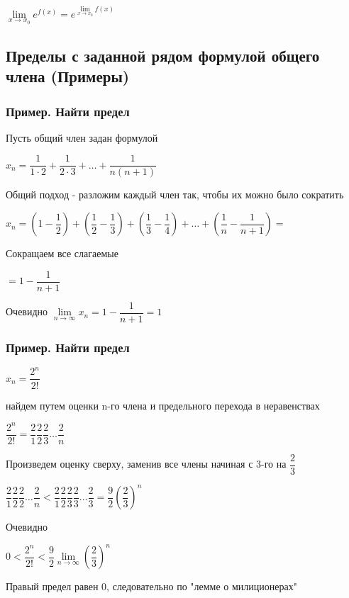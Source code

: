 $ \lim\limits_{x\to x_0} e^{f(x)} =  e^ {\lim\limits_{x\to x_0} {f(x)} }  $

\subsection{Пределы с заданной рядом формулой общего члена (Примеры)}

\subsubsection{Пример. Найти предел}

Пусть общий член задан формулой

$ x_{n} = \dfrac{1}{1 \cdot 2} + \dfrac{1}{2 \cdot 3} + \ldots + \dfrac{1}{n (n+1)}$

Общий подход - разложим каждый член так, чтобы их можно было сократить

$ x_{n} =  \left( 1 - \dfrac{1}{2} \right) +
\left(  \dfrac{1}{2} - \dfrac{1}{3} \right) +
\left(  \dfrac{1}{3} - \dfrac{1}{4} \right) +
\ldots +
\left(  \dfrac{1}{n} - \dfrac{1}{n+1} \right) =
 $
 
 Сокращаем все слагаемые
 
 $ = 1 - \dfrac{1}{n+1} $
 
 Очевидно $ \lim\limits_{n \to \infty} x_{n} = 1 - \dfrac{1}{n+1} = 1 $

\subsubsection{Пример. Найти предел}

$ x_{n} = \dfrac{2^{n}}{2!} $

найдем путем оценки n-го члена и предельного перехода в неравенствах

$ \dfrac{2^{n}}{2!} = \dfrac{2}{1}\dfrac{2}{2}\dfrac{2}{3} \ldots \dfrac{2}{n} $

Произведем оценку сверху, заменив все члены начиная с 3-го на $ \dfrac{2}{3} $

$ \dfrac{2}{1}\dfrac{2}{2}\dfrac{2}{2} \ldots \dfrac{2}{n} <
\dfrac{2}{1}\dfrac{2}{2}\dfrac{2}{3}\dfrac{2}{3} \ldots \dfrac{2}{3} = 
\dfrac{9}{2} \left( \dfrac{2}{3} \right)^{n}
$

Очевидно

$ 0 < \dfrac{2^{n}}{2!} < \dfrac{9}{2} \lim\limits_{n \to \infty} \left( \dfrac{2}{3} \right)^{n} $

Правый предел равен 0, следовательно по "лемме о милиционерах"

